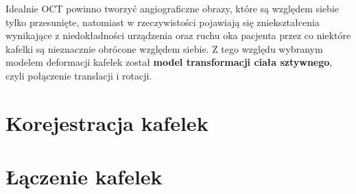 Idealnie OCT powinno tworzyć angiograficzne obrazy, które są względem siebie tylko przesunięte, natomiast w rzeczywistości pojawiają się zniekształcenia wynikające z niedokładności urządzenia oraz ruchu oka pacjenta przez co niektóre kafelki są nieznacznie obrócone względem siebie. Z tego względu wybranym modelem deformacji kafelek został \textbf{model transformacji ciała sztywnego}, czyli połączenie translacji i rotacji.

\section{Korejestracja kafelek}
\label{sec:algorytmy_korejestracji:korejestracja_kafelek}

\section{Łączenie kafelek}
\label{sec:algorytmy_korejestracji:laczenie_kafelek}






















